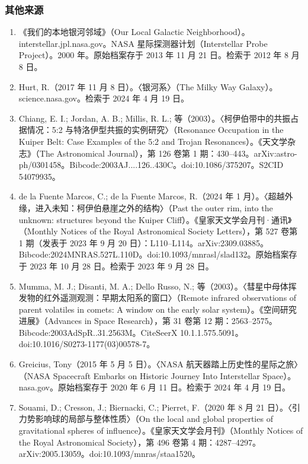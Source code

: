 \subsubsection{其他来源}
\begin{enumerate}
\item 《我们的本地银河邻域》（Our Local Galactic Neighborhood）。interstellar.jpl.nasa.gov。NASA 星际探测器计划（Interstellar Probe Project）。2000 年。原始档案存于 2013 年 11 月 21 日。检索于 2012 年 8 月 8 日。
\item Hurt, R.（2017 年 11 月 8 日）。〈银河系〉（The Milky Way Galaxy）。science.nasa.gov。检索于 2024 年 4 月 19 日。
\item Chiang, E. I.; Jordan, A. B.; Millis, R. L.; 等（2003）。〈柯伊伯带中的共振占据情况：5:2 与特洛伊型共振的实例研究〉（Resonance Occupation in the Kuiper Belt: Case Examples of the 5:2 and Trojan Resonances）。《天文学杂志》（The Astronomical Journal），第 126 卷第 1 期：430–443。arXiv:astro-ph/0301458。Bibcode:2003AJ....126..430C。doi:10.1086/375207。S2CID 54079935。
\item de la Fuente Marcos, C.; de la Fuente Marcos, R.（2024 年 1 月）。〈超越外缘，进入未知：柯伊伯悬崖之外的结构〉（Past the outer rim, into the unknown: structures beyond the Kuiper Cliff）。《皇家天文学会月刊·通讯》（Monthly Notices of the Royal Astronomical Society Letters），第 527 卷第 1 期（发表于 2023 年 9 月 20 日）：L110–L114。arXiv:2309.03885。Bibcode:2024MNRAS.527L.110D。doi:10.1093/mnrasl/slad132。原始档案存于 2023 年 10 月 28 日。检索于 2023 年 9 月 28 日。
\item Mumma, M. J.; Disanti, M. A.; Dello Russo, N.; 等（2003）。〈彗星中母体挥发物的红外遥测观测：早期太阳系的窗口〉（Remote infrared observations of parent volatiles in comets: A window on the early solar system）。《空间研究进展》（Advances in Space Research），第 31 卷第 12 期：2563–2575。Bibcode:2003AdSpR..31.2563M。CiteSeerX 10.1.1.575.5091。doi:10.1016/S0273-1177(03)00578-7。
\item Greicius, Tony（2015 年 5 月 5 日）。〈NASA 航天器踏上历史性的星际之旅〉（NASA Spacecraft Embarks on Historic Journey Into Interstellar Space）。nasa.gov。原始档案存于 2020 年 6 月 11 日。检索于 2024 年 4 月 19 日。
\item Souami, D.; Cresson, J.; Biernacki, C.; Pierret, F.（2020 年 8 月 21 日）。〈引力势影响球的局部与整体性质〉（On the local and global properties of gravitational spheres of influence）。《皇家天文学会月刊》（Monthly Notices of the Royal Astronomical Society），第 496 卷第 4 期：4287–4297。arXiv:2005.13059。doi:10.1093/mnras/staa1520。

\end{enumerate}
